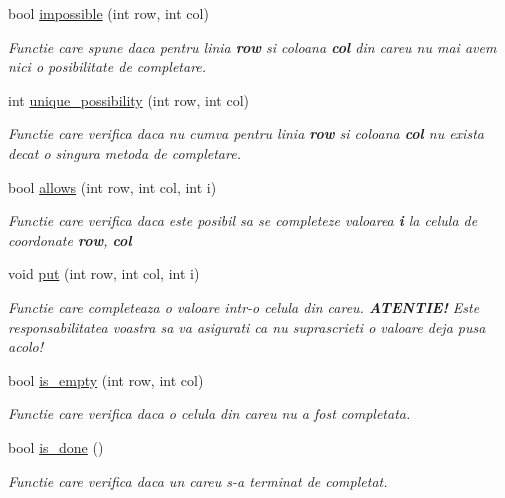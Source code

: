 \begin{DoxyCompactItemize}
\item 
bool \hyperlink{classSudokuBoard_aa5d810273b58996f5eb00522dc04c012}{impossible} (int row, int col)
\begin{DoxyCompactList}\small\item\em Functie care spune daca pentru linia {\bfseries row} si coloana {\bfseries col} din careu nu mai avem nici o posibilitate de completare. \item\end{DoxyCompactList}\item 
int \hyperlink{classSudokuBoard_add88bcf66d345b2822335d92713b8714}{unique\_\-possibility} (int row, int col)
\begin{DoxyCompactList}\small\item\em Functie care verifica daca nu cumva pentru linia {\bfseries row} si coloana {\bfseries col} nu exista decat o singura metoda de completare. \item\end{DoxyCompactList}\item 
bool \hyperlink{classSudokuBoard_a4ae4146f3ebed70288b41adb9ee1d8ed}{allows} (int row, int col, int i)
\begin{DoxyCompactList}\small\item\em Functie care verifica daca este posibil sa se completeze valoarea {\bfseries i} la celula de coordonate {\bfseries row}, {\bfseries col} \item\end{DoxyCompactList}\item 
void \hyperlink{classSudokuBoard_aff759e2337f20e107ed7e70d5cd8ca41}{put} (int row, int col, int i)
\begin{DoxyCompactList}\small\item\em Functie care completeaza o valoare intr-\/o celula din careu. {\bfseries ATENTIE!} Este responsabilitatea voastra sa va asigurati ca nu suprascrieti o valoare deja pusa acolo! \item\end{DoxyCompactList}\item 
bool \hyperlink{classSudokuBoard_a1e4d6cac572c9f4d4a573265da99f517}{is\_\-empty} (int row, int col)
\begin{DoxyCompactList}\small\item\em Functie care verifica daca o celula din careu nu a fost completata. \item\end{DoxyCompactList}\item 
bool \hyperlink{classSudokuBoard_ad53cca0148ad57fdaa05f9b92000fe66}{is\_\-done} ()
\begin{DoxyCompactList}\small\item\em Functie care verifica daca un careu s-\/a terminat de completat. \item\end{DoxyCompactList}\end{DoxyCompactItemize}
